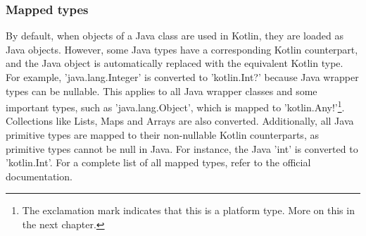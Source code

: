 \documentclass[a4paper, 11pt]{article}
\begin{document}
  \subsubsection{Mapped types}
    By default, when objects of a Java class are used in Kotlin, they are loaded as Java objects. However, some Java types have a corresponding Kotlin counterpart, and the Java object is automatically replaced with the equivalent Kotlin type. For example, 'java.lang.Integer' is converted to 'kotlin.Int?' because Java wrapper types can be nullable. This applies to all Java wrapper classes and some important types, such as 'java.lang.Object', which is mapped to 'kotlin.Any!'\footnote{The exclamation mark indicates that this is a platform type. More on this in the next chapter.}. Collections like Lists, Maps and Arrays are also converted. Additionally, all Java primitive types are mapped to their non-nullable Kotlin counterparts, as primitive types cannot be null in Java. For instance, the Java 'int' is converted to 'kotlin.Int'. For a complete list of all mapped types, refer to the official documentation.
\end{document}
